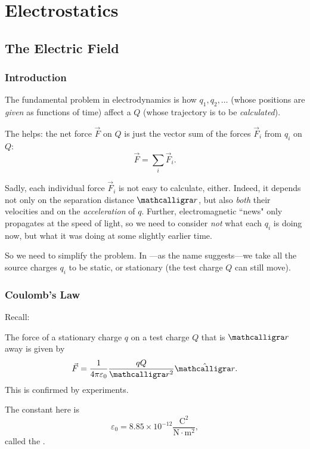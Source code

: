 \chapter{Electrostatics}

\section{The Electric Field}

\subsection{Introduction}

The fundamental problem in electrodynamics is how  $q_1,q_2,\dots$ (whose positions are \textit{given} as functions of time) affect a  $Q$ (whose trajectory is to be \textit{calculated}).

The  helps: the net force $\vec{F}$ on $Q$ is just the vector sum of the forces $\vec{F}_i$ from $q_i$ on $Q$:
\[\vec{F}=\sum_i \vec{F}_i.\]

Sadly, each individual force $\vec{F}_i$ is not easy to calculate, either. Indeed, it depends not only on the separation distance $\scr$, but also \textit{both} their velocities and on the \textit{acceleration} of $q$. Further, electromagnetic ``news" only propagates at the speed of light, so we need to consider \textit{not} what each $q_i$ is doing now, but what it was doing at some slightly earlier time.

So we need to simplify the problem. In ---as the name suggests---we take all the source charges $q_i$ to be static, or stationary (the test charge $Q$ can still move).

\subsection{Coulomb's Law}

Recall:

\begin{theorem}
The force of a stationary charge $q$ on a test charge $Q$ that is $\scr$ away is given by
\[\vec{F}=\frac{1}{4\pi\varepsilon_0}\frac{qQ}{\scr^2}{\hat{\scr}}.\]
This is confirmed by experiments. 
\end{theorem}

\begin{definition}
The constant here is
\[\varepsilon_0=8.85\times 10^{-12}\frac{\text{C}^2}{\text{N}\cdot\text{m}^2},\]
called the .
\end{definition}

